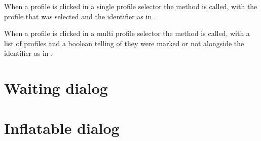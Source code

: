 

\noindent
When a profile is clicked in a single profile selector the  method is called, with the profile that was selected and the identifier  as in .



\noindent
When a profile is clicked in a multi profile selector the  method is called, with a list of profiles and a boolean telling of they were marked or not alongside the identifier  as in .

\section{Waiting dialog}
\label{sec:impl_waiting_dialog}



\section{Inflatable dialog}
\label{sec:impl_inflatable_dialog}





